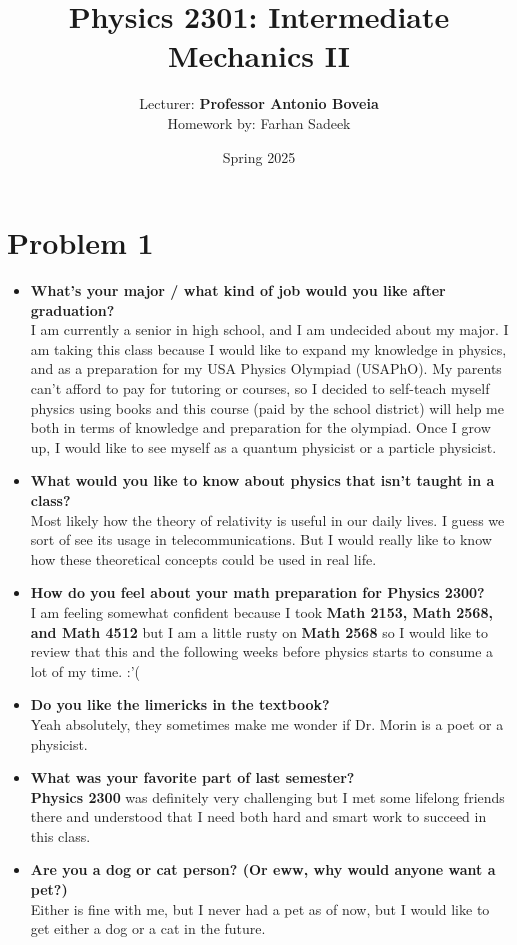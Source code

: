 \documentclass[11pt]{article}
\title{Physics 2301: Intermediate Mechanics II}
\author{Lecturer: \textbf{Professor Antonio Boveia}\\Homework by: Farhan Sadeek}
\date{Spring 2025}
\begin{document}
\maketitle
\section*{Problem 1}
\begin{itemize}
    \item \textbf{What's your major / what kind of job would you like after graduation?} \\
          I am currently a senior in high school, and I am undecided about my major. I am taking this class because I would like to expand my knowledge in physics, and as a preparation for my USA Physics Olympiad (USAPhO). My parents can't afford to pay for tutoring or courses, so I decided to self-teach myself physics using books and this course (paid by the school district) will help me both in terms of knowledge and preparation for the olympiad. Once I grow up, I would like to see myself as a quantum physicist or a particle physicist. \\

    \item \textbf{What would you like to know about physics that isn't taught in a class?} \\
          Most likely how the theory of relativity is useful in our daily lives. I guess we sort of see its usage in telecommunications. But I would really like to know how these theoretical concepts could be used in real life. \\

    \item \textbf{How do you feel about your math preparation for Physics 2300?} \\
          I am feeling somewhat confident because I took \textbf{Math 2153, Math 2568, and Math 4512} but I am a little rusty on \textbf{Math 2568} so I would like to review that this and the following weeks before physics starts to consume a lot of my time. :'(\\

    \item \textbf{Do you like the limericks in the textbook?} \\
          Yeah absolutely, they sometimes make me wonder if Dr. Morin is a poet or a physicist. \\

    \item \textbf{What was your favorite part of last semester?} \\
          \textbf{Physics 2300} was definitely very challenging but I met some lifelong friends there and understood that I need both hard and smart work to succeed in this class. \\

    \item \textbf{Are you a dog or cat person? (Or eww, why would anyone want a pet?)} \\
          Either is fine with me, but I never had a pet as of now, but I would like to get either a dog or a cat in the future. \\
\end{itemize}
\end{document}
